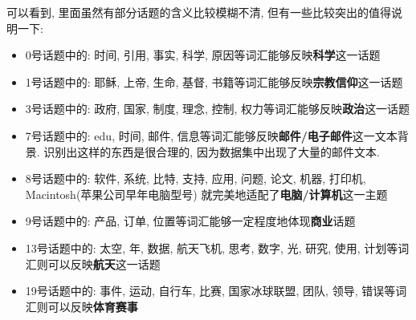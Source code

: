 \documentclass[UTF8]{article}
\begin{document}
可以看到, 里面虽然有部分话题的含义比较模糊不清, 但有一些比较突出的值得说明一下:
\begin{itemize}
\item 0号话题中的: 时间, 引用, 事实, 科学, 原因等词汇能够反映\textbf{科学}这一话题
\item 1号话题中的: 耶稣, 上帝, 生命, 基督, 书籍等词汇能够反映\textbf{宗教信仰}这一话题
\item 3号话题中的: 政府, 国家, 制度, 理念, 控制, 权力等词汇能够反映\textbf{政治}这一话题
\item 7号话题中的: edu, 时间, 邮件, 信息等词汇能够反映\textbf{邮件/电子邮件}这一文本背景. 识别出这样的东西是很合理的, 因为数据集中出现了大量的邮件文本.
\item 8号话题中的: 软件, 系统, 比特, 支持, 应用, 问题, 论文, 机器, 打印机, Macintosh(苹果公司早年电脑型号) 就完美地适配了\textbf{电脑/计算机}这一主题
\item 9号话题中的: 产品, 订单, 位置等词汇能够一定程度地体现\textbf{商业}话题
\item 13号话题中的: 太空, 年, 数据, 航天飞机, 思考, 数字, 光, 研究, 使用, 计划等词汇则可以反映\textbf{航天}这一话题
\item 19号话题中的: 事件, 运动, 自行车, 比赛, 国家冰球联盟, 团队, 领导, 错误等词汇则可以反映\textbf{体育赛事}
\end{itemize}
\end{document}
